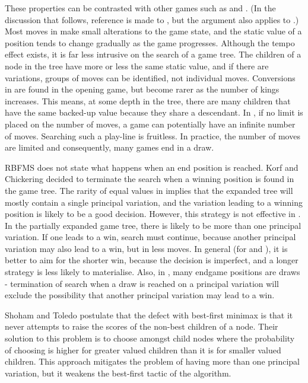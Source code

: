 These properties can be contrasted with other games such as  and .  (In the discussion that follows, reference is made to , but the argument also applies to .)  Most moves in  make small alterations to the game state, and the static value of a position tends to change gradually as the game progresses. Although the tempo effect exists, it is far less intrusive on the search of a  game tree. The children of a node in the  tree have more or less the same static value, and if there are variations, groups of moves can be identified, not individual moves.   Conversions in  are found in the opening game, but become rarer as the number of kings increases.  This means, at some depth in the tree, there are many children that have the same backed-up value because they share a descendant.  In , if no limit is placed on the number of moves, a game can potentially have an infinite number of moves.  Searching such a play-line is fruitless. In practice, the number of moves are limited and consequently, many  games end in a draw.

RBFMS does not state what happens when an end position is reached.  Korf and Chickering decided to terminate the search when a winning position is found in the  game tree.  The rarity of equal values in  implies that the expanded tree will mostly contain a single principal variation, and the variation leading to a winning position is likely to be a good decision.  However, this strategy is not effective in .  In the partially expanded  game tree, there is likely to be more than one principal variation.  If one leads to a win, search must continue, because another principal variation may also lead to a win, but in less moves.  In general (for  and ), it is better to aim for the shorter win, because the decision is imperfect, and a longer strategy is less likely to materialise.  Also, in , many endgame positions are draws - termination of search when a draw is reached on a principal variation will exclude the possibility that another principal variation may lead to a win.  

Shoham and Toledo \cite{shoham:randomized} postulate that the defect with best-first minimax is that it never attempts to raise the scores of the non-best children of a node.  Their solution to this problem is to choose amongst child nodes where the probability of choosing is higher for greater valued children than it is for smaller valued children.  This approach mitigates the problem of having more than one principal variation, but it weakens the best-first tactic of the algorithm. 

